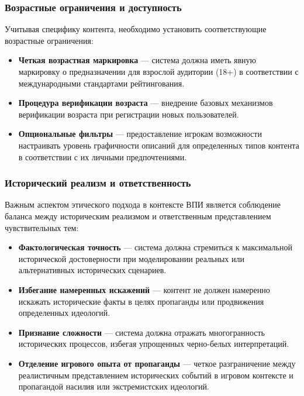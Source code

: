 \subsubsection{Возрастные ограничения и доступность}

Учитывая специфику контента, необходимо установить соответствующие возрастные ограничения:

\begin{itemize}
    \item \textbf{Четкая возрастная маркировка} — система должна иметь явную маркировку о предназначении для взрослой аудитории (18+) в соответствии с международными стандартами рейтингования.

    \item \textbf{Процедура верификации возраста} — внедрение базовых механизмов верификации возраста при регистрации новых пользователей.

    \item \textbf{Опциональные фильтры} — предоставление игрокам возможности настраивать уровень графичности описаний для определенных типов контента в соответствии с их личными предпочтениями.
\end{itemize}

\subsubsection{Исторический реализм и ответственность}

Важным аспектом этического подхода в контексте ВПИ является соблюдение баланса между историческим реализмом и ответственным представлением чувствительных тем:

\begin{itemize}
    \item \textbf{Фактологическая точность} — система должна стремиться к максимальной исторической достоверности при моделировании реальных или альтернативных исторических сценариев.

    \item \textbf{Избегание намеренных искажений} — контент не должен намеренно искажать исторические факты в целях пропаганды или продвижения определенных идеологий.

    \item \textbf{Признание сложности} — система должна отражать многогранность исторических процессов, избегая упрощенных черно-белых интерпретаций.

    \item \textbf{Отделение игрового опыта от пропаганды} — четкое разграничение между реалистичным представлением исторических событий в игровом контексте и пропагандой насилия или экстремистских идеологий.
\end{itemize}


